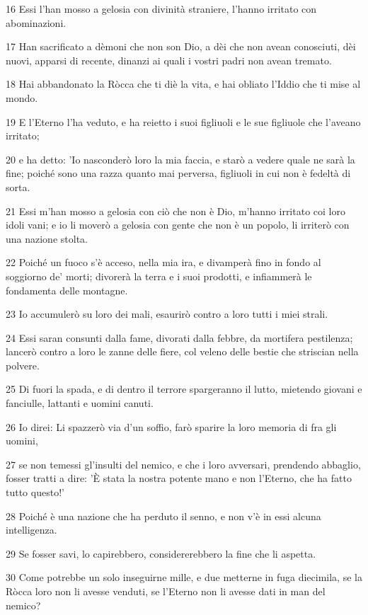 \par 16 Essi l'han mosso a gelosia con divinità straniere, l'hanno irritato con abominazioni.
\par 17 Han sacrificato a dèmoni che non son Dio, a dèi che non avean conosciuti, dèi nuovi, apparsi di recente, dinanzi ai quali i vostri padri non avean tremato.
\par 18 Hai abbandonato la Ròcca che ti diè la vita, e hai obliato l'Iddio che ti mise al mondo.
\par 19 E l'Eterno l'ha veduto, e ha reietto i suoi figliuoli e le sue figliuole che l'aveano irritato;
\par 20 e ha detto: 'Io nasconderò loro la mia faccia, e starò a vedere quale ne sarà la fine; poiché sono una razza quanto mai perversa, figliuoli in cui non è fedeltà di sorta.
\par 21 Essi m'han mosso a gelosia con ciò che non è Dio, m'hanno irritato coi loro idoli vani; e io li moverò a gelosia con gente che non è un popolo, li irriterò con una nazione stolta.
\par 22 Poiché un fuoco s'è acceso, nella mia ira, e divamperà fino in fondo al soggiorno de' morti; divorerà la terra e i suoi prodotti, e infiammerà le fondamenta delle montagne.
\par 23 Io accumulerò su loro dei mali, esaurirò contro a loro tutti i miei strali.
\par 24 Essi saran consunti dalla fame, divorati dalla febbre, da mortifera pestilenza; lancerò contro a loro le zanne delle fiere, col veleno delle bestie che striscian nella polvere.
\par 25 Di fuori la spada, e di dentro il terrore spargeranno il lutto, mietendo giovani e fanciulle, lattanti e uomini canuti.
\par 26 Io direi: Li spazzerò via d'un soffio, farò sparire la loro memoria di fra gli uomini,
\par 27 se non temessi gl'insulti del nemico, e che i loro avversari, prendendo abbaglio, fosser tratti a dire: 'È stata la nostra potente mano e non l'Eterno, che ha fatto tutto questo!'
\par 28 Poiché è una nazione che ha perduto il senno, e non v'è in essi alcuna intelligenza.
\par 29 Se fosser savi, lo capirebbero, considererebbero la fine che li aspetta.
\par 30 Come potrebbe un solo inseguirne mille, e due metterne in fuga diecimila, se la Ròcca loro non li avesse venduti, se l'Eterno non li avesse dati in man del nemico?

